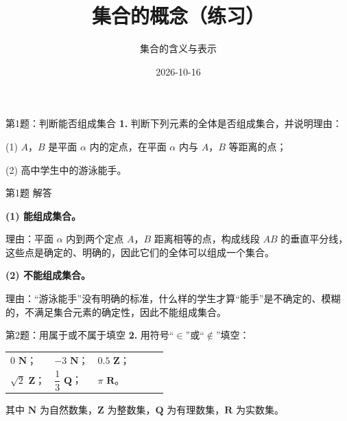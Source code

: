 \documentclass[10pt,aspectratio=169,serif]{beamer}
\title[集合的概念练习]{集合的概念（练习）}
\subtitle{集合的含义与表示}
\author{}
\institute{}
\date{2026-10-16}
\begin{document}
\begin{frame}
  \titlepage
\end{frame}

\begin{frame}[t]{第1题：判断能否组成集合}
\textbf{1.} 判断下列元素的全体是否组成集合，并说明理由：

\vspace{0.5em}
(1) $A$，$B$ 是平面 $\alpha$ 内的定点，在平面 $\alpha$ 内与 $A$，$B$ 等距离的点；

\vspace{0.5em}
(2) 高中学生中的游泳能手。
\end{frame}

\begin{frame}[t]{第1题 解答}
\begin{tcolorbox}[colback=orange!10,colframe=orange,title=\textbf{解}]
\textbf{(1) 能组成集合。}

\vspace{0.3em}
理由：平面 $\alpha$ 内到两个定点 $A$，$B$ 距离相等的点，构成线段 $AB$ 的垂直平分线，这些点是确定的、明确的，因此它们的全体可以组成一个集合。

\vspace{0.8em}
\textbf{(2) 不能组成集合。}

\vspace{0.3em}
理由：“游泳能手”没有明确的标准，什么样的学生才算“能手”是不确定的、模糊的，不满足集合元素的确定性，因此不能组成集合。
\end{tcolorbox}
\end{frame}

\begin{frame}[t]{第2题：用属于或不属于填空}
\textbf{2.} 用符号“$\in$”或“$\notin$”填空：

\vspace{1em}
\begin{center}
\begin{tabular}{llllll}
$0$ \underline{\hspace{1.2em}} $\mathbf{N}$；
& $-3$ \underline{\hspace{1.2em}} $\mathbf{N}$；
& $0.5$ \underline{\hspace{1.2em}} $\mathbf{Z}$；
\\[0.8em]
$\sqrt{2}$ \underline{\hspace{1.2em}} $\mathbf{Z}$；
& $\dfrac{1}{3}$ \underline{\hspace{1.2em}} $\mathbf{Q}$；
& $\pi$ \underline{\hspace{1.2em}} $\mathbf{R}$。
\end{tabular}
\end{center}

\vspace{1em}
{\small 其中 $\mathbf{N}$ 为自然数集，$\mathbf{Z}$ 为整数集，$\mathbf{Q}$ 为有理数集，$\mathbf{R}$ 为实数集。}
\end{frame}
\end{document}
